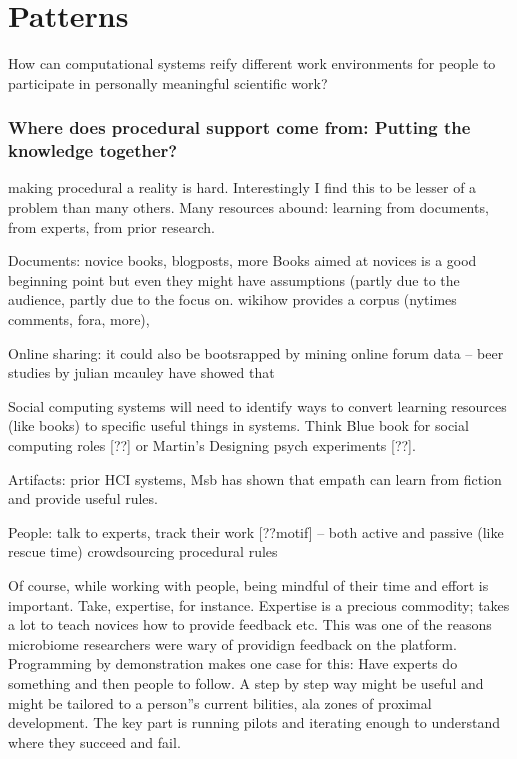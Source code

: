 \section{Patterns} 

How can computational systems reify different work environments for people to participate in personally meaningful scientific work?


\subsubsection{Where does procedural support come from: Putting the knowledge together?}
making procedural a reality is hard. Interestingly I find this to be lesser of a problem than many others. Many resources abound: learning from documents, from experts, from prior research. 

Documents: novice books, blogposts, more
Books aimed at novices is a good beginning point but even they might have assumptions (partly due to the audience, partly due to the focus on. wikihow provides a corpus
 (nytimes comments, fora, more),  

Online sharing: it could also be bootsrapped by mining online forum data -- beer studies by julian mcauley have showed that 


Social computing systems will need to identify ways to convert learning resources (like books) to specific useful things in systems. Think Blue book for social computing roles [??] or Martin’s Designing psych experiments [??]. 

Artifacts: prior HCI systems, Msb has shown that empath can learn from fiction and provide useful rules. 

People: talk to experts, track their work [??motif] -- both active and passive (like rescue time)
crowdsourcing procedural rules

Of course, while working with people, being mindful of their time and effort is important. Take, expertise, for instance. Expertise is a precious commodity; takes a lot to teach novices how to provide feedback etc. This was one of the reasons microbiome researchers were wary of providign feedback on the platform. Programming by demonstration makes one case for this: Have experts do something and then people to follow. A step by step way might be useful and might be tailored to a person''s current bilities, ala zones of proximal development.
The key part is running pilots and iterating enough to understand where they succeed and fail. 

